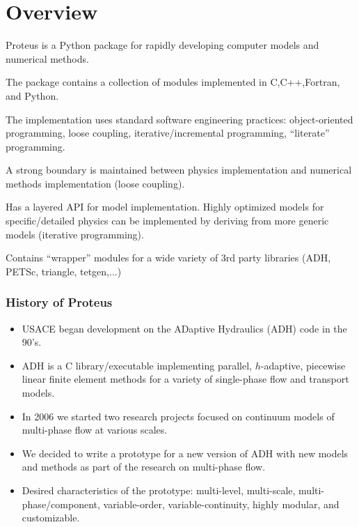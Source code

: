 \documentclass{beamer}
\begin{document}
\section{Overview}

\begin{frame}
\bit
\item Proteus is a Python package for rapidly developing computer models and numerical methods.
\item The package contains a collection of modules implemented in C,C++,Fortran, and Python.
\item The implementation uses standard software engineering practices:
  object-oriented programming, loose coupling, iterative/incremental
  programming, ``literate'' programming.
\item A strong boundary is maintained between physics implementation
  and numerical methods implementation (loose coupling).
\item Has a layered API for model implementation. Highly optimized
  models for specific/detailed physics can be implemented by deriving
  from more generic models (iterative programming).
\item Contains ``wrapper'' modules for a wide variety of 3rd party
  libraries (ADH, PETSc, triangle, tetgen,...)  \eit
\end{frame}

\begin{frame}
\frametitle{History of Proteus}
\begin{itemize}
\item USACE began development on the ADaptive Hydraulics (ADH) code in
  the 90's.
\item ADH is a C library/executable implementing parallel,
  $h$-adaptive, piecewise linear finite element methods for a variety
  of single-phase flow and transport models.
\item In 2006 we started two research projects focused on continuum
  models of multi-phase flow at various scales.
\item We decided to write a prototype for a new version of ADH with
  new models and methods as part of the research on multi-phase flow.
\item Desired characteristics of the prototype: multi-level,
  multi-scale, multi-phase/component, variable-order,
  variable-continuity, highly modular, and customizable.
\end{itemize}
\end{frame}
\end{document}
